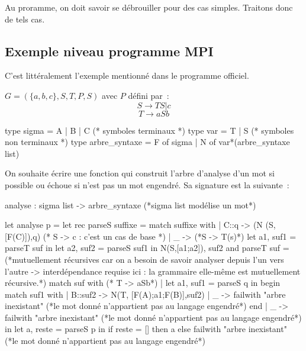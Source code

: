 \begin{adjustwidth}{-3cm}{-3cm}
Au proramme, on doit savoir se débrouiller pour des cas simples. Traitons donc de tels cas.

\subsection{Exemple niveau programme MPI}

    C'est littéralement l'exemple mentionné dans le programme officiel.

    $G = (\{a,b,c\},{S,T},P,S)$ avec $P$ défini par~:
    $$S \rightarrow TS \vert c$$
    $$T \rightarrow aSb$$

\begin{lstOCaml}
    type sigma = A | B | C (* symboles terminaux *)
    type var = T | S (* symboles non terminaux *)
    type arbre_syntaxe = F of sigma | N of var*(arbre_syntaxe list)
\end{lstOCaml}
    On souhaite écrire une fonction qui construit l'arbre d'analyse d'un mot si possible ou échoue si n'est pas un mot engendré. Sa signature est la suivante~:

\begin{lstOCaml}
    analyse : sigma list -> arbre_syntaxe (*sigma list modélise un mot*)
\end{lstOCaml}

\begin{lstOCaml}
    let analyse p = 
        let rec parseS suffixe = 
            match suffixe with
            | C::q -> (N (S,[F(C)]),q) (* S -> c : c'est un cas de base *)
            | _ -> (*S -> T(s)*)
                let a1, suf1 = parseT suf in
                let a2, suf2 = parseS suf1 in
                N(S,[a1;a2]), suf2
        and parseT suf = (*mutuellement récursives car on a besoin de savoir analyser depuis l'un vers l'autre -> interdépendance requise ici : la grammaire elle-même est mutuellement récursive.*)
            match suf with (* T -> aSb*)
            | let a1, suf1 = parseS q in begin
                match suf1 with
                    | B::suf2 -> N(T, [F(A);a1;F(B)],suf2)
                    | _ -> failwith "arbre inexistant" (*le mot donné n'appartient pas au langage engendré*)
                end
            | _ -> failwith "arbre inexistant" (*le mot donné n'appartient pas au langage engendré*)
        in let a, reste = parseS p in 
        if reste = [] then
            a
        else 
            failwith "arbre inexistant" (*le mot donné n'appartient pas au langage engendré*)
\end{lstOCaml}


\end{adjustwidth}
